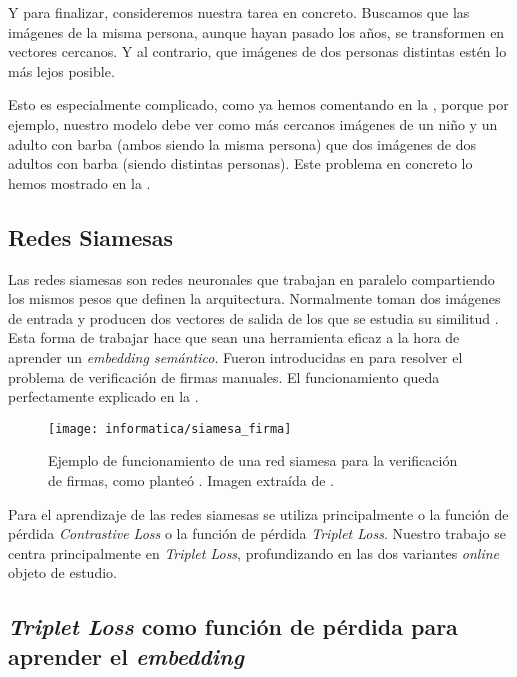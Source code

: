 \begin{ejemplo}

	Y para finalizar, consideremos nuestra tarea en concreto. Buscamos que las imágenes de la misma persona, aunque hayan pasado los años, se transformen en vectores cercanos. Y al contrario, que imágenes de dos personas distintas estén lo más lejos posible.

	Esto es especialmente complicado, como ya hemos comentando en la , porque por ejemplo, nuestro modelo debe ver como más cercanos imágenes de un niño y un adulto con barba (ambos siendo la misma persona) que dos imágenes de dos adultos con barba (siendo distintas personas). Este problema en concreto lo hemos mostrado en la .
\end{ejemplo}


\subsection{Redes Siamesas}

Las redes siamesas son redes neuronales que trabajan en paralelo compartiendo los mismos pesos que definen la arquitectura. Normalmente toman dos imágenes de entrada y producen dos vectores de salida de los que se estudia su similitud \cite{informatica:red_siamesa}. Esta forma de trabajar hace que sean una herramienta eficaz a la hora de aprender un \textit{embedding semántico}. Fueron introducidas en \cite{informatica:siamesa_lecunn} para resolver el problema de verificación de firmas manuales. El funcionamiento queda perfectamente explicado en la .

\begin{figure}[!hbtp]
	\centering
	\texttt{[image: informatica/siamesa\_firma]}
	\caption{Ejemplo de funcionamiento de una red siamesa para la verificación de firmas, como planteó \cite{informatica:siamesa_lecunn}. Imagen extraída de \cite{informatica:siamesa_web_imagen}.}
	\label{img:siamesa_firma}
\end{figure}

Para el aprendizaje de las redes siamesas se utiliza principalmente o la función de pérdida \textit{Contrastive Loss} o la función de pérdida \textit{Triplet Loss}. Nuestro trabajo se centra principalmente en \textit{Triplet Loss}, profundizando en las dos variantes \textit{online} objeto de estudio.

\subsection{\textit{Triplet Loss} como función de pérdida para aprender el \textit{embedding}} \label{isec:triplet_loss}

